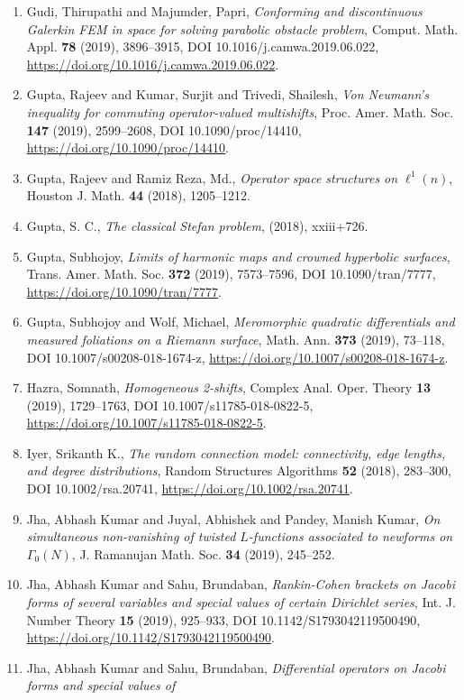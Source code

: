 \begin{enumerate}
\item Gudi, Thirupathi and Majumder, Papri, {\em Conforming and discontinuous {G}alerkin {FEM} in space for
solving parabolic obstacle problem}, Comput. Math. Appl. {\bf 78} (2019), 3896--3915, DOI 10.1016/j.camwa.2019.06.022, \url{https://doi.org/10.1016/j.camwa.2019.06.022}.
\item Gupta, Rajeev and Kumar, Surjit and Trivedi, Shailesh, {\em Von {N}eumann's inequality for commuting operator-valued
multishifts}, Proc. Amer. Math. Soc. {\bf 147} (2019), 2599--2608, DOI 10.1090/proc/14410, \url{https://doi.org/10.1090/proc/14410}.
\item Gupta, Rajeev and Ramiz Reza, Md., {\em Operator space structures on {$\ell^1(n)$}}, Houston J. Math. {\bf 44} (2018), 1205--1212.
\item Gupta, S. C., {\em The classical {S}tefan problem},  {\bf } (2018), xxiii+726.
\item Gupta, Subhojoy, {\em Limits of harmonic maps and crowned hyperbolic surfaces}, Trans. Amer. Math. Soc. {\bf 372} (2019), 7573--7596, DOI 10.1090/tran/7777, \url{https://doi.org/10.1090/tran/7777}.
\item Gupta, Subhojoy and Wolf, Michael, {\em Meromorphic quadratic differentials and measured foliations on
a {R}iemann surface}, Math. Ann. {\bf 373} (2019), 73--118, DOI 10.1007/s00208-018-1674-z, \url{https://doi.org/10.1007/s00208-018-1674-z}.
\item Hazra, Somnath, {\em Homogeneous 2-shifts}, Complex Anal. Oper. Theory {\bf 13} (2019), 1729--1763, DOI 10.1007/s11785-018-0822-5, \url{https://doi.org/10.1007/s11785-018-0822-5}.
\item Iyer, Srikanth K., {\em The random connection model: connectivity, edge lengths, and
degree distributions}, Random Structures Algorithms {\bf 52} (2018), 283--300, DOI 10.1002/rsa.20741, \url{https://doi.org/10.1002/rsa.20741}.
\item Jha, Abhash Kumar and Juyal, Abhishek and Pandey, Manish
Kumar, {\em On simultaneous non-vanishing of twisted {$L$}-functions
associated to newforms on {$\Gamma_0(N)$}}, J. Ramanujan Math. Soc. {\bf 34} (2019), 245--252.
\item Jha, Abhash Kumar and Sahu, Brundaban, {\em Rankin-{C}ohen brackets on {J}acobi forms of several variables
and special values of certain {D}irichlet series}, Int. J. Number Theory {\bf 15} (2019), 925--933, DOI 10.1142/S1793042119500490, \url{https://doi.org/10.1142/S1793042119500490}.
\item Jha, Abhash Kumar and Sahu, Brundaban, {\em Differential operators on {J}acobi forms and special values of
}
\end{enumerate}
